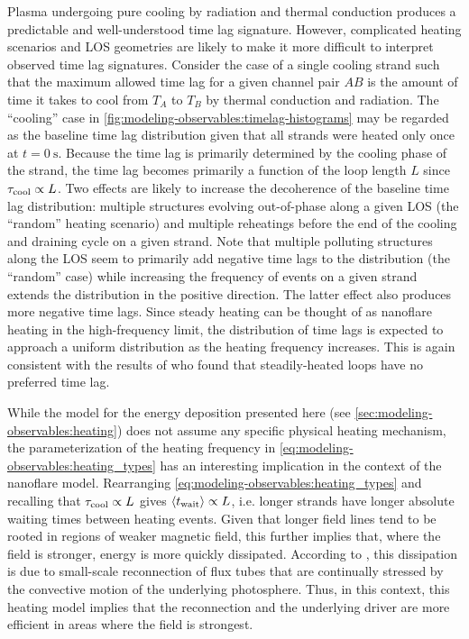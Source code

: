 Plasma undergoing pure cooling by radiation and thermal conduction produces a predictable and well-understood time lag signature. However, complicated heating scenarios and LOS geometries are likely to make it more difficult to interpret observed time lag signatures. Consider the case of a single cooling strand such that the maximum allowed time lag for a given channel pair $AB$ is the amount of time it takes to cool from $T_A$ to $T_B$ by thermal conduction and radiation. The ``cooling'' case in \autoref{fig:modeling-observables:timelag-histograms} may be regarded as the baseline time lag distribution given that all strands were heated only once at $t=\SI{0}{\second}$. Because the time lag is primarily determined by the cooling phase of the strand, the time lag becomes primarily a function of the loop length $L$ since $\tau_\textup{cool}\propto L$. Two effects are likely to increase the decoherence of the baseline time lag distribution: multiple structures evolving out-of-phase along a given LOS (the ``random'' heating scenario) and multiple reheatings before the end of the cooling and draining cycle on a given strand. Note that multiple polluting structures along the LOS seem to primarily add negative time lags to the distribution (the ``random'' case) while increasing the frequency of events on a given strand extends the distribution in the positive direction. The latter effect also produces more negative time lags. Since steady heating can be thought of as nanoflare heating in the high-frequency limit, the distribution of time lags is expected to approach a uniform distribution as the heating frequency increases. This is again consistent with the results of \citet{viall_signatures_2016} who found that steadily-heated loops have no preferred time lag.

While the model for the energy deposition presented here (see \autoref{sec:modeling-observables:heating}) does not assume any specific physical heating mechanism, the parameterization of the heating frequency in \autoref{eq:modeling-observables:heating_types} has an interesting implication in the context of the \citet{parker_nanoflares_1988} nanoflare model. Rearranging \autoref{eq:modeling-observables:heating_types} and recalling that $\tau_\textup{cool}\propto L$ gives $\langle t_{\textup{wait}}\rangle\propto L$, i.e. longer strands have longer absolute waiting times between heating events. Given that longer field lines tend to be rooted in regions of weaker magnetic field, this further implies that, where the field is stronger, energy is more quickly dissipated. According to \citet{parker_nanoflares_1988}, this dissipation is due to small-scale reconnection of flux tubes that are continually stressed by the convective motion of the underlying photosphere. Thus, in this context, this heating model implies that the reconnection and the underlying driver are more efficient in areas where the field is strongest.

